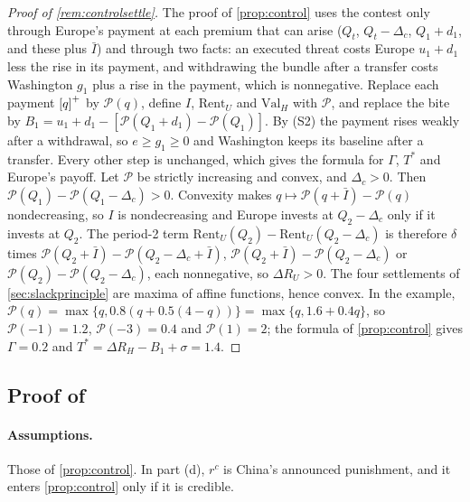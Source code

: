 \begin{proof}[Proof of \cref{rem:controlsettle}]
The proof of \cref{prop:control} uses the contest only through Europe's payment at each premium that can arise ($Q_t$, $Q_t-\Delta_c$, $Q_1+d_1$, and these plus $\bar I$) and through two facts: an executed threat costs Europe $u_1+d_1$ less the rise in its payment, and withdrawing the bundle after a transfer costs Washington $g_1$ plus a rise in the payment, which is nonnegative. Replace each payment $\left[q\right]^{+}$ by $\mathcal P(q)$, define $I$, $\mathrm{Rent}_U$ and $\mathrm{Val}_H$ with $\mathcal P$, and replace the bite by $B_1=u_1+d_1-[\mathcal P(Q_1+d_1)-\mathcal P(Q_1)]$. By (S2) the payment rises weakly after a withdrawal, so $e\ge g_1\ge 0$ and Washington keeps its baseline after a transfer. Every other step is unchanged, which gives the formula for $\Gamma$, $T^*$ and Europe's payoff. Let $\mathcal P$ be strictly increasing and convex, and $\Delta_c>0$. Then $\mathcal P(Q_1)-\mathcal P(Q_1-\Delta_c)>0$. Convexity makes $q\mapsto\mathcal P(q+\bar I)-\mathcal P(q)$ nondecreasing, so $I$ is nondecreasing and Europe invests at $Q_2-\Delta_c$ only if it invests at $Q_2$. The period-2 term $\mathrm{Rent}_U(Q_2)-\mathrm{Rent}_U(Q_2-\Delta_c)$ is therefore $\delta$ times $\mathcal P(Q_2+\bar I)-\mathcal P(Q_2-\Delta_c+\bar I)$, $\mathcal P(Q_2+\bar I)-\mathcal P(Q_2-\Delta_c)$ or $\mathcal P(Q_2)-\mathcal P(Q_2-\Delta_c)$, each nonnegative, so $\Delta R_U>0$. The four settlements of \cref{sec:slackprinciple} are maxima of affine functions, hence convex. In the example, $\mathcal P(q)=\max\{q,0.8(q+0.5(4-q))\}=\max\{q,1.6+0.4q\}$, so $\mathcal P(-1)=1.2$, $\mathcal P(-3)=0.4$ and $\mathcal P(1)=2$; the formula of \cref{prop:control} gives $\Gamma=0.2$ and $T^*=\Delta R_H-B_1+\sigma=1.4$.
\end{proof}

\subsection{Proof of \texorpdfstring{}{motive, investment, enforceability and China}}

\paragraph{Assumptions.} Those of \cref{prop:control}. In part (d), $r^c$ is China's announced punishment, and it enters \cref{prop:control} only if it is credible.

